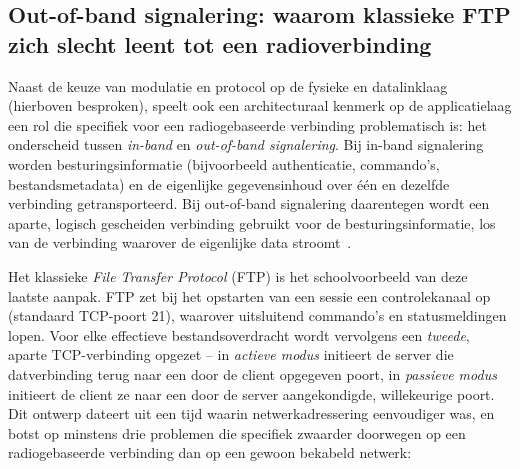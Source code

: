 \subsection{Out-of-band signalering: waarom klassieke FTP zich slecht leent tot een radioverbinding}%
\label{subsec:oob-signalering}

Naast de keuze van modulatie en protocol op de fysieke en datalinklaag (hierboven
besproken), speelt ook een architecturaal kenmerk op de applicatielaag een rol die
specifiek voor een radiogebaseerde verbinding problematisch is: het onderscheid tussen
\textit{in-band} en \textit{out-of-band signalering}. Bij in-band signalering worden
besturingsinformatie (bijvoorbeeld authenticatie, commando's, bestandsmetadata) en de
eigenlijke gegevensinhoud over \'e\'en en dezelfde verbinding getransporteerd. Bij
out-of-band signalering daarentegen wordt een aparte, logisch gescheiden verbinding
gebruikt voor de besturingsinformatie, los van de verbinding waarover de eigenlijke data
stroomt~\autocite{Tanenbaum2021}.

Het klassieke \textit{File Transfer Protocol} (FTP) is het schoolvoorbeeld van deze
laatste aanpak. FTP zet bij het opstarten van een sessie een controlekanaal op (standaard
TCP-poort 21), waarover uitsluitend commando's en statusmeldingen lopen. Voor elke
effectieve bestandsoverdracht wordt vervolgens een \emph{tweede}, aparte TCP-verbinding
opgezet -- in \textit{actieve modus} initieert de server die datverbinding terug naar een
door de client opgegeven poort, in \textit{passieve modus} initieert de client ze naar een
door de server aangekondigde, willekeurige poort. Dit ontwerp dateert uit een tijd waarin
netwerkadressering eenvoudiger was, en botst op minstens drie problemen die specifiek
zwaarder doorwegen op een radiogebaseerde verbinding dan op een gewoon bekabeld netwerk:

